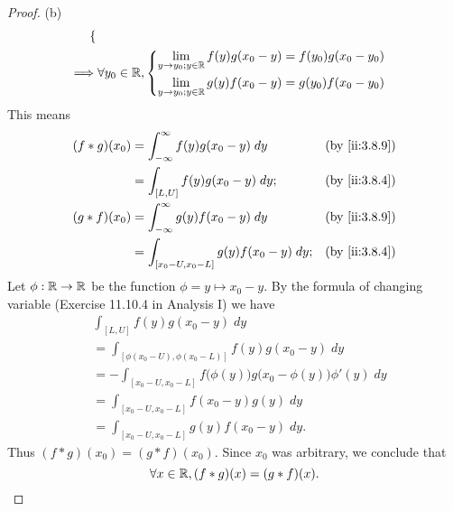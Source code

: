 \begin{proof}{(b)}
\begin{align*}
\begin{dcases}
                                   \end{dcases}             \\
    \implies & \forall y_0 \in \mathbb{R}, \begin{dcases}
                                     \lim_{y \to y_0 ; y \in \mathbb{R}} f(y) g(x_0 - y) = f(y_0) g(x_0 - y_0) \\
                                     \lim_{y \to y_0 ; y \in \mathbb{R}} g(y) f(x_0 - y) = g(y_0) f(x_0 - y_0)
                                   \end{dcases}
  \end{align*}
  This means
  \begin{align*}
    (f * g)(x_0) & = \int_{-\infty}^\infty f(y) g(x_0 - y) \; dy      &  & \by{ii:3.8.9} \\
                 & = \int_{[L, U]} f(y) g(x_0 - y) \; dy;             &  & \by{ii:3.8.4} \\
    (g * f)(x_0) & = \int_{-\infty}^\infty g(y) f(x_0 - y) \; dy      &  & \by{ii:3.8.9} \\
                 & = \int_{[x_0 - U, x_0 - L]} g(y) f(x_0 - y) \; dy; &  & \by{ii:3.8.4}
  \end{align*}
  Let \(\phi : \mathbb{R} \to \mathbb{R}\) be the function \(\phi = y \mapsto x_0 - y\).
  By the formula of changing variable (Exercise 11.10.4 in Analysis I) we have
  \begin{align*}
     & \int_{[L, U]} f(y) g(x_0 - y) \; dy                                                     \\
     & = \int_{[\phi(x_0 - U), \phi(x_0 - L)]} f(y) g(x_0 - y) \; dy                           \\
     & = -\int_{[x_0 - U, x_0 - L]} f\big(\phi(y)\big) g\big(x_0 - \phi(y)\big) \phi'(y) \; dy \\
     & = \int_{[x_0 - U, x_0 - L]} f(x_0 - y) g(y) \; dy                                       \\
     & = \int_{[x_0 - U, x_0 - L]} g(y) f(x_0 - y) \; dy.
  \end{align*}
  Thus \((f * g)(x_0) = (g * f)(x_0)\).
  Since \(x_0\) was arbitrary, we conclude that
  \[
    \forall x \in \mathbb{R}, (f * g)(x) = (g * f)(x).
  \]
\end{proof}


